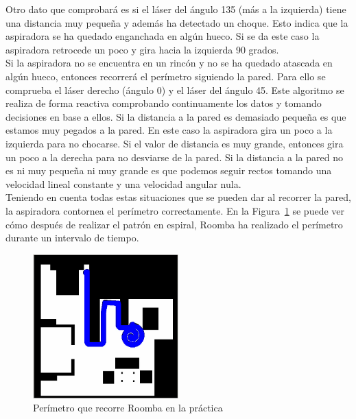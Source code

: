 Otro dato que comprobará es si el láser del ángulo 135 (más a la izquierda) tiene una distancia muy pequeña y además ha detectado un choque. Esto indica que la aspiradora se ha quedado enganchada en algún hueco. Si se da este caso la aspiradora retrocede un poco y gira hacia la izquierda 90 grados.\\

Si la aspiradora no se encuentra en un rincón y no se ha quedado atascada en algún hueco, entonces recorrerá el perímetro siguiendo la pared. Para ello se comprueba el láser derecho (ángulo 0) y el láser del ángulo 45. Este algoritmo se realiza de forma reactiva comprobando continuamente los datos y tomando decisiones en base a ellos. Si la distancia a la pared es demasiado pequeña es que estamos muy pegados a la pared. En este caso la aspiradora gira un poco a la izquierda para no chocarse. Si el valor de distancia es muy grande, entonces gira un poco a la derecha para no desviarse de la pared. Si la distancia a la pared no es ni muy pequeña ni muy grande es que podemos seguir rectos tomando una velocidad lineal constante y una velocidad angular nula.\\

Teniendo en cuenta todas estas situaciones que se pueden dar al recorrer la pared, la aspiradora contornea el perímetro correctamente. En la Figura~\ref{fig.Perimetro_Roomba} se puede ver cómo después de realizar el patrón en espiral, Roomba ha realizado el perímetro durante un intervalo de tiempo.\\

\begin{figure}[H]
  \begin{center}
    \includegraphics[width=0.5\textwidth]{figures/Vacuum/Perimetro_Roomba.png}
		\caption{Perímetro que recorre Roomba en la práctica}
		\label{fig.Perimetro_Roomba}
		\end{center}
\end{figure}

